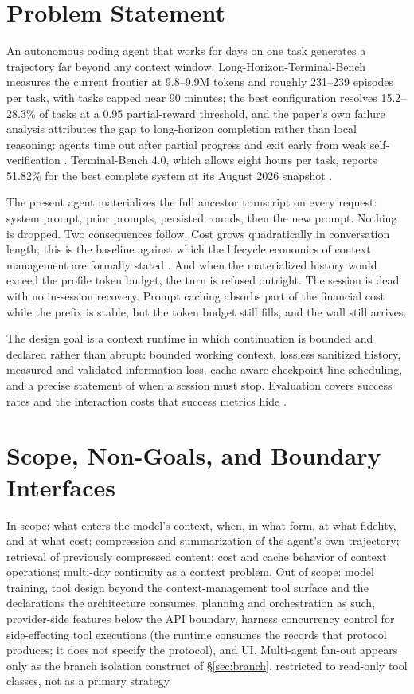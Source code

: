 \documentclass[11pt]{article}
\begin{document}
\tableofcontents
\newpage

\section{Problem Statement}

An autonomous coding agent that works for days on one task generates a trajectory far beyond any context window. Long-Horizon-Terminal-Bench measures the current frontier at 9.8--9.9M tokens and roughly 231--239 episodes per task, with tasks capped near 90 minutes; the best configuration resolves 15.2--28.3\% of tasks at a 0.95 partial-reward threshold, and the paper's own failure analysis attributes the gap to long-horizon completion rather than local reasoning: agents time out after partial progress and exit early from weak self-verification \cite{lhtb2026}. Terminal-Bench 4.0, which allows eight hours per task, reports 51.82\% for the best complete system at its August 2026 snapshot \cite{tb42026}.

The present agent materializes the full ancestor transcript on every request: system prompt, prior prompts, persisted rounds, then the new prompt. Nothing is dropped. Two consequences follow. Cost grows quadratically in conversation length; this is the baseline against which the lifecycle economics of context management are formally stated \cite{lifecycle2026}. And when the materialized history would exceed the profile token budget, the turn is refused outright. The session is dead with no in-session recovery. Prompt caching absorbs part of the financial cost while the prefix is stable, but the token budget still fills, and the wall still arrives.

The design goal is a context runtime in which continuation is bounded and declared rather than abrupt: bounded working context, lossless sanitized history, measured and validated information loss, cache-aware checkpoint-line scheduling, and a precise statement of when a session must stop. Evaluation covers success rates and the interaction costs that success metrics hide \cite{interact2026}.

\section{Scope, Non-Goals, and Boundary Interfaces}

In scope: what enters the model's context, when, in what form, at what fidelity, and at what cost; compression and summarization of the agent's own trajectory; retrieval of previously compressed content; cost and cache behavior of context operations; multi-day continuity as a context problem. Out of scope: model training, tool design beyond the context-management tool surface and the declarations the architecture consumes, planning and orchestration as such, provider-side features below the API boundary, harness concurrency control for side-effecting tool executions (the runtime consumes the records that protocol produces; it does not specify the protocol), and UI. Multi-agent fan-out appears only as the branch isolation construct of \S\ref{sec:branch}, restricted to read-only tool classes, not as a primary strategy.
\end{document}
